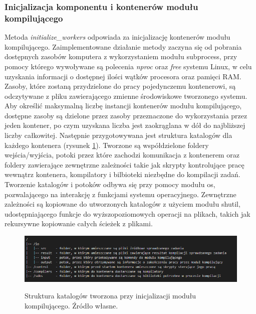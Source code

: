 \subsubsection{Inicjalizacja komponentu i kontenerów modułu kompilującego}
Metoda \textit{initialize\_workers} odpowiada za inicjalizację kontenerów modułu kompilującego. Zaimplementowane działanie metody zaczyna się od pobrania dostępnych zasobów komputera z wykorzystaniem modułu subprocess\cite{pythonSubprocess}, przy pomocy którego wywoływane są polecenia \textit{nproc}\cite{linuxNproc} oraz \textit{free}\cite{linuxFree} systemu Linux, w celu uzyskania informacji o dostępnej ilości wątków procesora oraz pamięci RAM. Zasoby, które zostaną przydzielone do pracy pojedynczemu kontenerowi, są odczytywane z pliku zawierającego zmienne środowiskowe tworzonego systemu. Aby określić maksymalną liczbę instancji kontenerów modułu kompilującego, dostępne zasoby są dzielone przez zasoby przeznaczone do wykorzystania przez jeden kontener, po czym uzyskana liczba jest zaokrąglana w dół do najbliższej liczby całkowitej. Następnie przygotowywana jest struktura katalogów dla każdego kontenera (rysunek \ref{fig:scheduler-directory-structure}). Tworzone są współdzielone foldery wejścia/wyjścia, potoki przez które zachodzi komunikacja z kontenerem oraz foldery zawierające zewnętrzne zależności takie jak skrypty kontrolujące pracę wewnątrz kontenera, kompilatory i bilbioteki niezbędne do kompilacji zadań. Tworzenie katalogów i potoków odbywa się przy pomocy modułu os\cite{pytohnOs}, pozwalającego na interakcję z funkcjami systemu operacyjnego. Zewnętrzne zależności są kopiowane do utworzonych katalogów z użyciem modułu shutil\cite{pythonShutil}, udostępniającego funkcje do wyższopoziomowych operacji na plikach, takich jak rekursywne kopiowanie całych ścieżek z plikami.
\begin{figure}[!ht]
	\begin{center}
		\resizebox{1\textwidth}{!} {
			\includegraphics{img/3/orkiestrator-kontenerow-struktura-katalogow.png}
		}
		\caption{Struktura katalogów tworzona przy inicjalizacji modułu kompilującego. Źródło własne.}
		\label{fig:scheduler-directory-structure}
	\end{center}
\end{figure}
